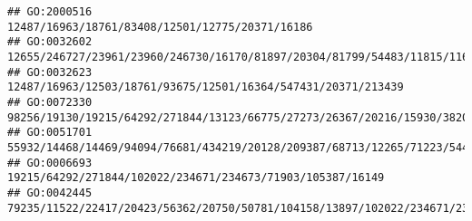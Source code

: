 \documentclass[
]{article}
\begin{document}
\begin{verbatim}
## GO:2000516                                                                                                                                                                                                                                                                                                                                                              12487/16963/18761/83408/12501/12775/20371/16186
## GO:0032602                                                                                                                                                                                                                                                                                                                              12655/246727/23961/23960/246730/16170/81897/20304/81799/54483/11815/11629/16149
## GO:0032623                                                                                                                                                                                                                                                                                                                                                12487/16963/12503/18761/93675/12501/16364/547431/20371/213439
## GO:0072330                                                                                                                                                                                                                                                                                              98256/19130/19215/64292/271844/13123/66775/27273/26367/20216/15930/382044/104158/13897/11808/66113/103142/16149
## GO:0051701                                                                                                                                                                                                                                                                                                                 55932/14468/14469/94094/76681/434219/20128/209387/68713/12265/71223/54419/57757/224762/16149
## GO:0006693                                                                                                                                                                                                                                                                                                                                                   19215/64292/271844/102022/234671/234673/71903/105387/16149
## GO:0042445                                                                                                                                                                                                                                                                               79235/11522/22417/20423/56362/20750/50781/104158/13897/102022/234671/234673/103142/105387/58226/17287/13078/14419/72082/226278

\end{verbatim}
\end{document}
